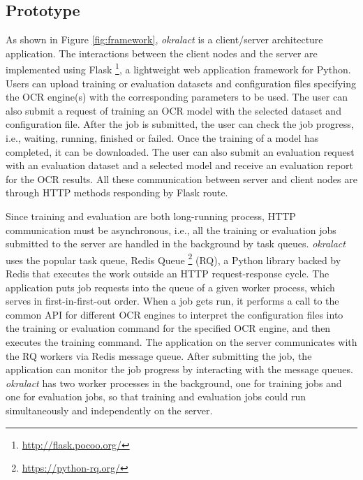 \documentclass[sigconf]{acmart}
\begin{document}
\subsection{Prototype}
\label{sec:prototype}

As shown in Figure \ref{fig:framework}, \textit{okralact} is a client/server
architecture application. The interactions between the client nodes and the
server are implemented using Flask \footnote{\url{http://flask.pocoo.org/}}, a lightweight web application framework for Python.
Users can upload training or evaluation datasets and configuration files
specifying the OCR engine(s) with the corresponding parameters to be used. 
The user can also submit a request of training an OCR model with the selected 
dataset and configuration file. After the job is submitted, the user can check the job
progress, i.e., waiting, running, finished or failed. Once the training of a model has completed, it can be downloaded.
The user can also submit an evaluation request with an evaluation dataset and
a selected model and receive an evaluation report for the OCR results. All these communication between server and client nodes are through HTTP methods responding by Flask route.  



Since training and evaluation are both long-running process, HTTP communication must be asynchronous,
i.e., all the training or evaluation
jobs submitted to the server are handled in the background by task queues. \textit{okralact} uses the popular task queue, Redis Queue \footnote{\url{https://python-rq.org/}} (RQ),
a Python library backed by Redis that
executes the work outside an HTTP request-response cycle. The application puts job
requests into the queue of a given worker process, which serves in
first-in-first-out order. When a job gets run, it performs a call to the common
API for different OCR engines to interpret the configuration files into the
training or evaluation command for the specified OCR engine, and then executes the training command. The application on the server communicates with the RQ workers via Redis message queue. After submitting the job, the application can monitor the job progress by interacting with the message queues. \textit{okralact} has two worker processes in the background, one for training jobs and one for evaluation jobs, so that training and evaluation jobs could run simultaneously and independently on the server.
\end{document}
